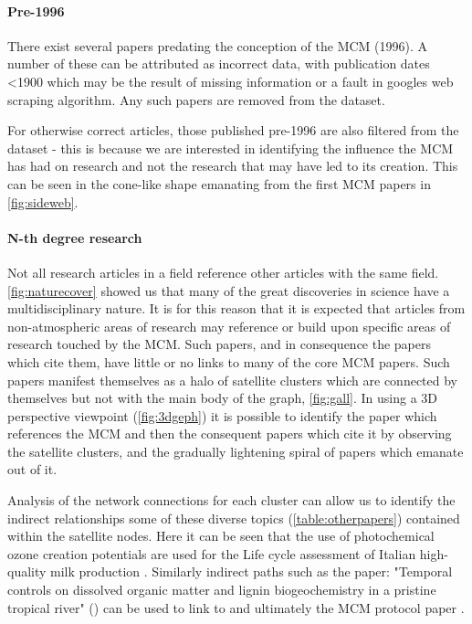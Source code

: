 \paragraph*{Pre-1996}
There exist several papers predating the conception of the MCM (1996). A number of these can be attributed as incorrect data, with publication dates <1900 which may be the result of missing information or a fault in googles web scraping algorithm. Any such papers are removed from the dataset.

 For otherwise correct articles, those published pre-1996 are also filtered from the dataset - this is because we are interested in identifying the influence the MCM has had on research and not the research that may have led to its creation. This can be seen in the cone-like shape emanating from the first MCM papers in \autoref{fig:sideweb}.

\paragraph*{N-th degree research}
Not all research articles in a field reference other articles with the same field. \autoref{fig:naturecover} showed us that many of the great discoveries in science have a multidisciplinary nature. It is for this reason that it is expected that articles from non-atmospheric areas of research may reference or build upon specific areas of research touched by the MCM. Such papers, and in consequence the papers which cite them, have little or no links to many of the core MCM papers. Such papers manifest themselves as a halo of satellite clusters which are connected by themselves but not with the main body of the graph, \autoref{fig:gall}. In using a 3D perspective viewpoint (\autoref{fig:3dgeph}) it is possible to identify the paper which references the MCM and then the consequent papers which cite it by observing the satellite clusters, and the gradually lightening spiral of papers which emanate out of it. 

Analysis of the network connections for each cluster can allow us to identify the indirect relationships some of these diverse topics (\autoref{table:otherpapers}) contained within the satellite nodes. Here it can be seen that the use of photochemical ozone creation potentials \citep{milk1,milk2} are used for the Life cycle assessment of Italian high-quality milk production \citep{milk}. 
Similarly indirect paths such as the paper:
 "Temporal controls on dissolved organic matter and lignin biogeochemistry in a pristine tropical river" (\citep{biogeo}) can be used to link to \citep{georiver1} and ultimately the MCM protocol paper \citep{mcmpartA}.
 
